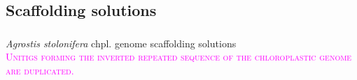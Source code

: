 \documentclass{beamer}
\begin{document}
\subsection{Scaffolding solutions}\label{scafsols}
\begin{frame}
\frametitle{\textsc{}}
{\textit{Agrostis stolonifera} chpl. genome scaffolding solutions} \\
\vspace*{0.5cm}
\footnotesize \textsc{\textcolor{magenta}{Unitigs forming the inverted repeated sequence of the chloroplastic genome are duplicated. }}
\begin{center}
\end{center}
\end{frame}
\end{document}
